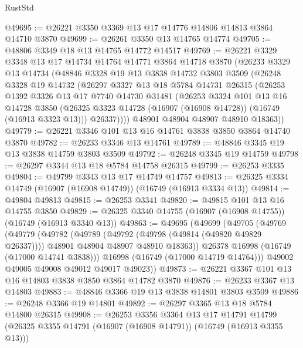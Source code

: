 \begin{lexlean}{RustStd}
\begin{coremodule}
@49695 := @26221 @3350 @3369 @13 @17 @14776 @14806 @14813 @3864 @14710 @3870
@49699 := @26261 @3350 @13 @14765 @14774
@49705 := @48806 @3349 @18 @13 @14765 @14772 @14517
@49769 := @26221
    @3329
    @3348
    @13
    @17
    @14734
    @14764
    @14771
    @3864
    @14718
    @3870
    (@26233
      @3329
      @13
      @14734
      (@48846
        @3328
        @19
        @13
        @3838
        @14732
        @3803
        @3509
        (@26248
          @3328
          @19
          @14732
          (@26297
            @3327
            @13
            @18
            @5784
            @14731
            @26315
            (@26253
              @1392
              @3326
              @13
              @17
              @7740
              @14730
              @31481
              (@26253
                @3324
                @101
                @13
                @16
                @14728
                @3850
                (@26325 @3323 @14728 (@16907 (@16908 @14728)) (@16749 (@16913 @3323 @13)))
                @26337))))
        @48901
        @48904
        @48907
        @48910
        @18363))
@49779 := @26221 @3346 @101 @13 @16 @14761 @3838 @3850 @3864 @14740 @3870
@49782 := @26233 @3346 @13 @14761
@49789 := @48846 @3345 @19 @13 @3838 @14759 @3803 @3509
@49792 := @26248 @3345 @19 @14759
@49798 := @26297 @3344 @13 @18 @5784 @14758 @26315
@49799 := @26253 @3335
@49804 := @49799 @3343 @13 @17 @14749 @14757
@49813 := @26325 @3334 @14749 (@16907 (@16908 @14749)) (@16749 (@16913 @3334 @13))
@49814 := @49804 @49813
@49815 := @26253 @3341
@49820 := @49815 @101 @13 @16 @14755 @3850
@49829 := @26325 @3340 @14755 (@16907 (@16908 @14755)) (@16749 (@16913 @3340 @13))
@49863 := @49695
    (@49699
      (@49705
        (@49769
          (@49779
            (@49782
              (@49789
                (@49792 (@49798 (@49814 (@49820 @49829 @26337))))
                @48901
                @48904
                @48907
                @48910
                @18363))
            @26378
            @16998
            (@16749 (@17000 @14741 @3838)))
          @16998
          (@16749 (@17000 @14719 @14764)))
        @49002
        @49005
        @49008
        @49012
        @49017
        @49023))
@49873 := @26221 @3367 @101 @13 @16 @14803 @3838 @3850 @3864 @14782 @3870
@49876 := @26233 @3367 @13 @14803
@49883 := @48846 @3366 @19 @13 @3838 @14801 @3803 @3509
@49886 := @26248 @3366 @19 @14801
@49892 := @26297 @3365 @13 @18 @5784 @14800 @26315
@49908 := @26253
    @3356
    @3364
    @13
    @17
    @14791
    @14799
    (@26325 @3355 @14791 (@16907 (@16908 @14791)) (@16749 (@16913 @3355 @13)))

\end{coremodule}
\end{lexlean}

